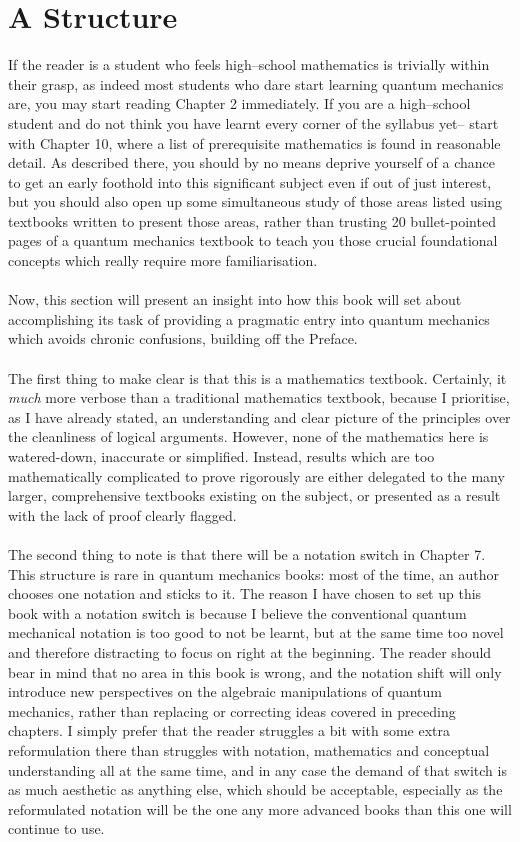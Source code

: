 \section{A Structure}
If the reader is a student who feels high--school mathematics is trivially within their grasp, as indeed most students who dare start learning quantum mechanics are, you may start reading Chapter 2 immediately. If you are a high--school student and do not think you  have learnt every corner of the syllabus yet-- start with Chapter 10, where a list of prerequisite mathematics is found in reasonable detail. As described there, you should by no means deprive yourself of a chance to get an early foothold into this significant subject even if out of just interest, but you should also open up some simultaneous study of those areas listed using textbooks written to present those areas, rather than trusting 20 bullet-pointed pages of a quantum mechanics textbook to teach you those crucial foundational concepts which really require more familiarisation.
\\\\
Now, this section will present an insight into how this book will set about accomplishing its task of providing a pragmatic entry into quantum mechanics which avoids chronic confusions, building off the Preface. 
\\\\
The first thing to make clear is that this is a mathematics textbook. Certainly, it \textit{much} more verbose than a traditional mathematics textbook, because I prioritise, as I have already stated, an understanding and clear picture of the principles over the cleanliness of logical arguments. However, none of the mathematics here is watered-down, inaccurate or simplified. Instead, results which are too mathematically complicated to prove rigorously are either delegated to the many larger, comprehensive textbooks existing on the subject, or presented as a result with the lack of proof clearly flagged.
\\\\
The second thing to note is that there will be a notation switch in Chapter 7. This structure is rare in quantum mechanics books: most of the time, an author chooses one notation and sticks to it. The reason I have chosen to set up this book with a notation switch is because I believe the conventional quantum mechanical notation is too good to not be learnt, but at the same time too novel and therefore distracting to focus on right at the beginning. The reader should bear in mind that no area in this book is wrong, and the notation shift will only introduce new perspectives on the algebraic manipulations of quantum mechanics, rather than replacing or correcting ideas covered in preceding chapters. I simply prefer that the reader struggles a bit with some extra reformulation there than struggles with notation, mathematics and conceptual understanding all at the same time, and in any case the demand of that switch is as much aesthetic as anything else, which should be acceptable, especially as the reformulated notation will be the one any more advanced books than this one will continue to use.
